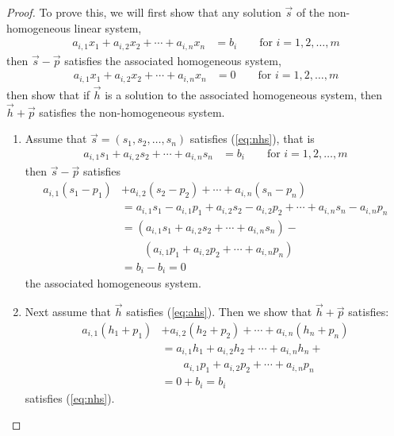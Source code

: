 \begin{proof}
To prove this, we will first show that any solution $\vec{s}$ of the non-homogeneous linear system, 
%
\begin{align}
a_{i,1} x_1 + a_{i,2} x_2 + \cdots + a_{i,n} x_n & = b_i \qquad \text{for $i=1,2,\ldots,m$}
\label{eq:nhs}
\end{align}
then $\vec{s}-\vec{p}$ satisfies the associated homogeneous system,
%
\begin{align}
a_{i,1} x_1 + a_{i,2} x_2 + \cdots + a_{i,n} x_n & = 0 \qquad \text{for $i=1,2,\ldots,m$}
\label{eq:ahs}
\end{align}
 then show that if $\vec{h}$ is a solution to the associated homogeneous system, then $\vec{h}+\vec{p}$ satisfies the non-homogeneous system.  
 
\begin{enumerate}
\item Assume that $\vec{s}=(s_1,s_2, \ldots,s_n)$ satisfies (\ref{eq:nhs}), that is
%
\begin{align*}
a_{i,1} s_1 + a_{i,2} s_2 + \cdots + a_{i,n} s_n & = b_i \qquad \text{for $i=1,2,\ldots,m$}
\end{align*}
then $\vec{s}-\vec{p}$ satisfies
%
\begin{align*}
a_{i,1} (s_1-p_1)& + a_{i,2}(s_2-p_2) + \cdots + a_{i,n}(s_n-p_n)\\
\qquad & =
a_{i,1} s_1 - a_{i,1} p_1 + a_{i,2} s_2 - a_{i,2} p_2 + \cdots + a_{i,n} s_n - a_{i,n} p_n \\
& = (a_{i,1} s_1 + a_{i,2} s_2 + \cdots + a_{i,n} s_n) - \\
& \qquad 
(a_{i,1} p_1 + a_{i,2} p_2 + \cdots + a_{i,n} p_n) \\
& = b_i - b_i = 0 
\end{align*}
the associated homogeneous system.  

\item Next assume that  $\vec{h}$ satisfies (\ref{eq:ahs}).  Then we show that $\vec{h}+\vec{p}$ satisfies:
%
\begin{align*}
a_{i,1} (h_1+p_1)& + a_{i,2} (h_2+p_2) + \cdots + a_{i,n} (h_n+p_n) \\
 & = a_{i,1} h_1 + a_{i,2} h_2 + \cdots + a_{i,n} h_n + \\
 & \qquad a_{i,1} p_1 + a_{i,2} p_2 + \cdots + a_{i,n} p_n \\
 & = 0 + b_i = b_i
\end{align*}
satisfies (\ref{eq:nhs}).  
\end{enumerate}


 
\end{proof}


